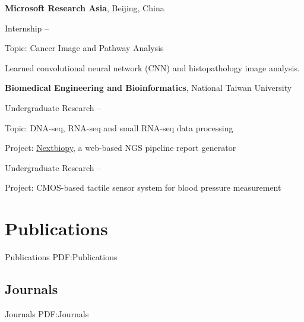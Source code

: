 \documentclass[a4paper,10pt,oneside]{article}
\begin{document}
\begin{body}
\textbf{Microsoft Research Asia},
Beijing, China
\par
Internship
\hfill
{} --
\begin{detail}
    \begin{detailitem}
        \item Topic: Cancer Image and Pathway Analysis
        \item Learned convolutional neural network (CNN) and histopathology image analysis.
    \end{detailitem}
\end{detail}


\BigEntryGap
\textbf{Biomedical Engineering and Bioinformatics},
National Taiwan University
\par
Undergraduate Research%
\hfill
{} --
\begin{detail}
    \begin{detailitem}
        \item Topic: DNA-seq, RNA-seq and small RNA-seq data processing
        \item Project: \href{https://github.com/BioCloud-TW/nextbiopy}{Nextbiopy}, a web-based NGS pipeline report generator
    \end{detailitem}
\end{detail}

\EntryGapNoBreak
Undergraduate Research%
\hfill
{} --
\begin{detail}
    \begin{detailitem}
    \item Project: CMOS-based tactile sensor system for blood pressure measurement
    \end{detailitem}
\end{detail}


\section
{Publications}
{Publications}
{PDF:Publications}

\subsection
{Journals}
{Journals}
{PDF:Journals}

\begin{publication}[series=pub, widest*=100]


\end{publication}
\end{body}
\end{document}
